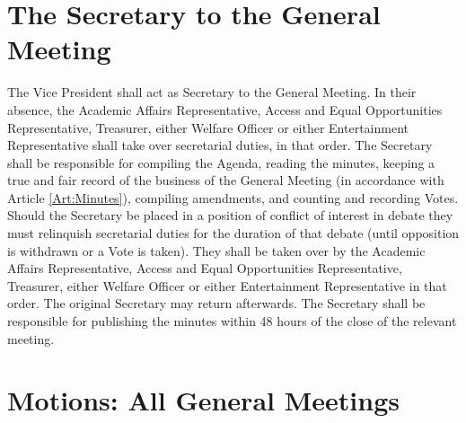 \section{The Secretary to the General Meeting}
\npara The Vice President shall act as Secretary to the General Meeting. In their absence, the Academic Affairs Representative, Access and Equal Opportunities Representative, Treasurer, either Welfare Officer or either Entertainment Representative shall take over secretarial duties, in that order.
\npara The Secretary shall be responsible for compiling the Agenda, reading the minutes, keeping a true and fair record of the business of the General Meeting (in accordance with Article \ref{Art:Minutes}), compiling amendments, and counting and recording Votes.
\npara Should the Secretary be placed in a position of conflict of interest in debate they must relinquish secretarial duties for the duration of that debate (until opposition is withdrawn or a Vote is taken). They shall be taken over by the Academic Affairs Representative, Access and Equal Opportunities Representative, Treasurer, either Welfare Officer or either Entertainment Representative in that order. The original Secretary may return afterwards.
\npara The Secretary shall be responsible for publishing the minutes within 48 hours of the close of the relevant meeting.
\section{Motions: All General Meetings}
